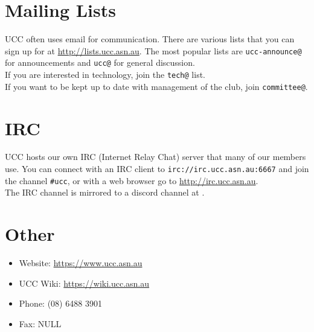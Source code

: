 \section{Mailing Lists}
UCC often uses email for communication. There are various lists that you can sign up for at \url{http://lists.ucc.asn.au}. The most popular lists are \texttt{ucc-announce@} for announcements and \texttt{ucc@} for general discussion.\\
If you are interested in technology, join the \texttt{tech@} list.\\
If you want to be kept up to date with management of the club, join \texttt{committee@}.
\section{IRC}
UCC hosts our own IRC (Internet Relay Chat) server that many of our members use. You can connect with an IRC client to \texttt{irc://irc.ucc.asn.au:6667} and join the channel \texttt{\#ucc}, or with a web browser go to 
\url{http://irc.ucc.asn.au}.\\
The IRC channel is mirrored to a discord channel at \url{}.
\section{Other}
\begin{itemize}
	\item Website:	\url{https://www.ucc.asn.au}
	\item UCC Wiki:	\url{https://wiki.ucc.asn.au}
	\item Phone:	(08) 6488 3901
	\item Fax:		NULL
\end{itemize}